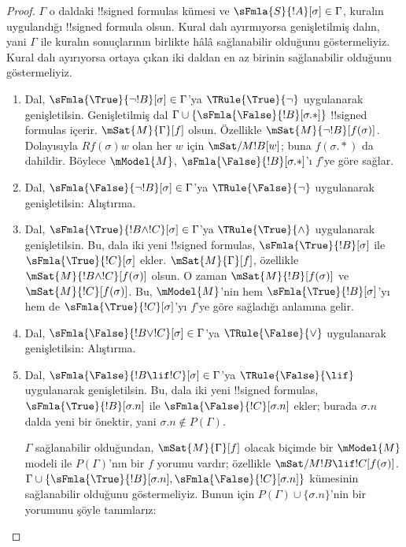\documentclass[../../../include/open-logic-section]{subfiles}
\begin{document}
\begin{proof}
$\Gamma$ o daldaki !!{signed formula}s kümesi ve
$\sFmla{S}{!A}[\sigma] \in \Gamma$, kuralın uygulandığı !!{signed formula}
olsun. Kural dalı ayırmıyorsa genişletilmiş dalın, yani $\Gamma$ ile kuralın
sonuçlarının birlikte hâlâ sağlanabilir olduğunu göstermeliyiz. Kural dalı
ayırıyorsa ortaya çıkan iki daldan en az birinin sağlanabilir olduğunu
göstermeliyiz.
\begin{enumerate}
\item Dal, $\sFmla{\True}{\lnot !B}[\sigma] \in \Gamma$'ya
  $\TRule{\True}{\lnot}$ uygulanarak genişletilsin. Genişletilmiş dal
  $\Gamma \cup \{\sFmla{\False}{!B}[\sigma.{*}]\}$ !!{signed formula}s
  içerir. $\mSat{M}{\Gamma}[f]$ olsun. Özellikle
  $\mSat{M}{\lnot !B}[f(\sigma)]$. Dolayısıyla $Rf(\sigma)w$ olan her $w$
  için $\mSat/{M}{!B}[w]$; buna $f(\sigma.{*})$ da dahildir. Böylece
  $\mModel{M}$, $\sFmla{\False}{!B}[\sigma.{*}]$'ı $f$'ye göre sağlar.
\item Dal, $\sFmla{\False}{\lnot !B}[\sigma] \in \Gamma$'ya
  $\TRule{\False}{\lnot}$ uygulanarak genişletilsin: Alıştırma.
\item Dal, $\sFmla{\True}{!B \land !C}[\sigma] \in \Gamma$'ya
  $\TRule{\True}{\land}$ uygulanarak genişletilsin. Bu, dala iki yeni
  !!{signed formula}s, $\sFmla{\True}{!B}[\sigma]$ ile
  $\sFmla{\True}{!C}[\sigma]$ ekler. $\mSat{M}{\Gamma}[f]$, özellikle
  $\mSat{M}{!B \land !C}[f(\sigma)]$ olsun. O zaman
  $\mSat{M}{!B}[f(\sigma)]$ ve $\mSat{M}{!C}[f(\sigma)]$. Bu,
  $\mModel{M}$'nin hem $\sFmla{\True}{!B}[\sigma]$'yı hem de
  $\sFmla{\True}{!C}[\sigma]$'yı $f$'ye göre sağladığı anlamına gelir.
\item Dal, $\sFmla{\False}{!B \lor !C}[\sigma] \in \Gamma$'ya
  $\TRule{\False}{\lor}$ uygulanarak genişletilsin: Alıştırma.
\item Dal, $\sFmla{\False}{!B \lif !C}[\sigma] \in \Gamma$'ya
  $\TRule{\False}{\lif}$ uygulanarak genişletilsin. Bu, dala iki yeni
  !!{signed formula}s, $\sFmla{\True}{!B}[\sigma.n]$ ile
  $\sFmla{\False}{!C}[\sigma.n]$ ekler; burada $\sigma.n$ dalda yeni bir
  önektir, yani $\sigma.n \notin P(\Gamma)$.

  $\Gamma$ sağlanabilir olduğundan, $\mSat{M}{\Gamma}[f]$ olacak biçimde bir
  $\mModel{M}$ modeli ile $P(\Gamma)$'nın bir $f$ yorumu vardır; özellikle
  $\mSat/{M}{!B \lif !C}[f(\sigma)]$. $\Gamma \cup
  \{\sFmla{\True}{!B}[\sigma.n],
  \sFmla{\False}{!C}[\sigma.n]\}$ kümesinin sağlanabilir olduğunu
  göstermeliyiz. Bunun için $P(\Gamma) \cup \{\sigma.n\}$'nin bir yorumunu
  şöyle tanımlarız:


\end{enumerate}
\end{proof}
\end{document}
